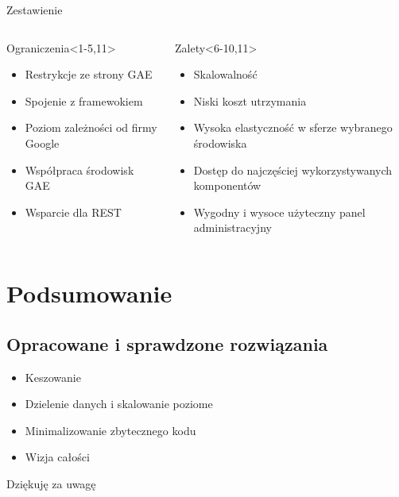 \documentclass[slitetop]{beamer}
\begin{document}
\begin{frame}{Zestawienie}
\begin{columns}
    \begin{alertblock}{Ograniczenia}<1-5,11>
    \begin{itemize}
        \item<1- | alert@+> Restrykcje ze strony GAE
        \item<2- | alert@+> Spojenie z  framewokiem
        \item<3- | alert@+> Poziom zależności od firmy Google
        \item<4- | alert@+> Współpraca środowisk GAE
        \item<5- | alert@+> Wsparcie dla REST
  \end{itemize}
  \end{alertblock}
    \begin{exampleblock}{Zalety}<6-10,11>
    \begin{itemize}
        \item<6- | alert@+> Skalowalność
        \item<7- | alert@+> Niski koszt utrzymania 
        \item<8- | alert@+> Wysoka elastyczność w sferze wybranego środowiska 
        \item<9- | alert@+> Dostęp do najczęściej wykorzystywanych komponentów
        \item<10- | alert@+> Wygodny i wysoce użyteczny panel administracyjny
    \end{itemize}
    \end{exampleblock}
\end{columns}
\end{frame}



\section{Podsumowanie}
\subsection{Opracowane i sprawdzone rozwiązania}

\begin{frame}{}
\begin{itemize}
\item{Keszowanie}
\item{Dzielenie danych i skalowanie poziome}
\item{Minimalizowanie zbytecznego kodu}
\item{Wizja całości}
\end{itemize}
\end{frame}

\begin{frame}{}
\begin{center}
\huge{Dziękuję za uwagę}
\end{center}
\end{frame}
\end{document}
